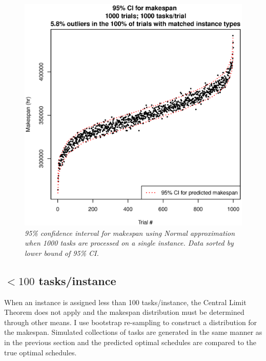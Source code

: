 \documentclass[12pt]{report}
\begin{document}
\begin{figure}
\includegraphics[width=1\textwidth]{validate-stochastic-runtimes-1000-trials-1000-tasks.eps}
\caption{\textit{95\% confidence interval for makespan using Normal approximation when 1000 tasks are processed on a single instance. Data sorted by lower bound of 95\% CI.}}
\label{fig:validate-stochastic-runtimes-1000-trials-1000-tasks}
\end{figure}


\subsection{$< 100$ tasks/instance}

When an instance is assigned less than 100 tasks/instance, the Central Limit Theorem does not apply and the makespan distribution must be determined through other means.
I use bootstrap re-sampling to construct a distribution for the makespan.
Simulated collections of tasks are generated in the same manner as in the previous section and the predicted optimal schedules are compared to the true optimal schedules.
\end{document}

